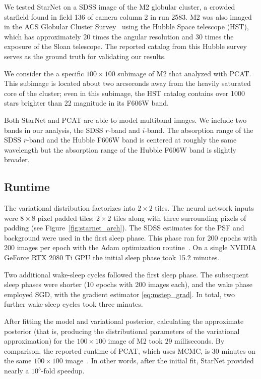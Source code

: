 \label{sec:results_on_m2}
We tested StarNet on a SDSS image of the M2 globular cluster, a crowded starfield found in field 136 of camera column 2 in run 2583.
M2 was also imaged in the ACS Globular Cluster Survey~\cite{Sarajedini_2007}
using the Hubble Space telescope (HST),
which has approximately 20 times the angular resolution and 30 times the exposure of the Sloan telescope. The reported catalog from this Hubble survey serves as the ground truth for validating our results.

We consider the a specific $100 \times 100$ subimage of M2 that \cite{Portillo_2017, Feder_2019} analyzed with PCAT.
This subimage is located about two arcseconds away from the heavily saturated core of the cluster;
even in this subimage, the HST catalog contains over 1000 stars brighter than 22 magnitude in its F606W band.

Both StarNet and PCAT are able to model multiband images. We include two bands in our analysis, the SDSS $r$-band and $i$-band. 
The absorption range of the SDSS $r$-band and the Hubble F606W band is centered at roughly the same wavelength but the absorption range of the Hubble F606W band is slightly broader. 

\subsection{Runtime} 
\label{sec:runtime}
The variational distribution factorizes into $2\times2$ tiles. 
The neural network inputs were $8\times8$ pixel padded tiles: 
$2\times 2$ tiles along with three surrounding pixels of padding (see Figure~\ref{fig:starnet_arch}). 
The SDSS estimates for the PSF and background were used in the first sleep phase. 
This phase ran for 200 epochs with 200 images per epoch with  
the Adam optimization routine~\cite{kingma2014adam}. 
On a single NVIDIA GeForce RTX 2080 Ti GPU 
the initial sleep phase took 15.2 minutes.

Two additional wake-sleep cycles followed the first sleep phase. 
The subsequent sleep phases were shorter (10 epochs with 200 images each), and the wake phase employed SGD, with the gradient estimator \eqref{eq:mstep_grad}. In total, two further wake-sleep cycles took three minutes. 

After fitting the model and variational posterior, calculating the approximate posterior (that is, producing the distributional parameters of the variational approximation) for the $100 \times 100$ image of M2 took $29$ milliseconds. 
By comparison, the reported runtime of PCAT, which uses MCMC, is 30 minutes on the same $100 \times 100$ image~\cite{Feder_2019}.
In other words, after the initial fit, StarNet provided nearly a $10^5$-fold speedup. 

